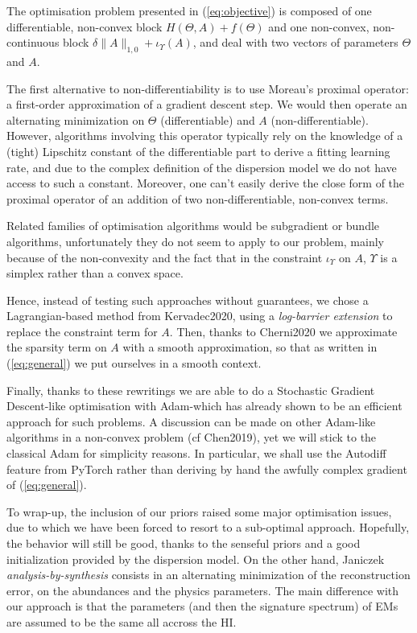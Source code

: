\documentclass{article}
\begin{document}
The optimisation problem presented in (\ref{eq:objective}) is composed of one differentiable, non-convex block $H(\Theta, A) + f(\Theta)$ and one non-convex, non-continuous block $\delta\|A\|_{1,0} + \iota_\Upsilon (A)$, and deal with two vectors of parameters $\Theta$ and $A$.

The first alternative to non-differentiability is to use Moreau's proximal operator: a first-order approximation of a gradient descent step. We would then operate an alternating minimization on $\Theta$ (differentiable) and $A$ (non-differentiable). However, algorithms involving this operator typically rely on the knowledge of a (tight) Lipschitz constant of the differentiable part to derive a fitting learning rate, and due to the complex definition of the dispersion model we do not have access to such a constant. Moreover, one can't easily derive the close form of the proximal operator of an addition of two non-differentiable, non-convex terms.

Related families of optimisation algorithms would be subgradient or bundle algorithms, unfortunately they do not seem to apply to our problem, mainly because of the non-convexity and the fact that in the constraint $\iota_\Upsilon$ on $A$, $\Upsilon$ is a simplex rather than a convex space.

Hence, instead of testing such approaches without guarantees, we chose a Lagrangian-based method from Kervadec2020, using a \emph{log-barrier extension} to replace the constraint term for $A$. Then, thanks to Cherni2020 we approximate the sparsity term on $A$ with a smooth approximation, so that as written in (\ref{eq:general}) we put ourselves in a smooth context.

Finally, thanks to these rewritings we are able to do a Stochastic Gradient Descent-like optimisation with Adam-which has already shown to be an efficient approach for such problems. A discussion can be made on other Adam-like algorithms in a non-convex problem (cf Chen2019), yet we will stick to the classical Adam for simplicity reasons. In particular, we shall use the Autodiff feature from PyTorch rather than deriving by hand the awfully complex gradient of (\ref{eq:general}).

To wrap-up, the inclusion of our priors raised some major optimisation issues, due to which we have been forced to resort to a sub-optimal approach. Hopefully, the behavior will still be good, thanks to the senseful priors and a good initialization provided by the dispersion model. On the other hand, Janiczek \emph{analysis-by-synthesis} consists in an alternating minimization of the reconstruction error, on the abundances and the physics parameters. The main difference with our approach is that the parameters (and then the signature spectrum) of EMs are assumed to be the same all accross the HI.
\end{document}
